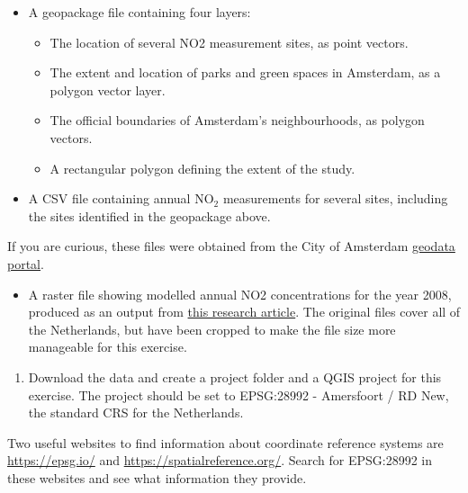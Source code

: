 \documentclass[
  letterpaper,
  DIV=11,
  numbers=noendperiod]{scrreprt}
\providecommand{\tightlist}{%
  \setlength{\itemsep}{0pt}\setlength{\parskip}{0pt}}\usepackage{longtable,booktabs,array}
\begin{document}
\begin{itemize}
\tightlist
\item
  A geopackage file containing four layers:

  \begin{itemize}
  \tightlist
  \item
    The location of several NO2 measurement sites, as point vectors.
  \item
    The extent and location of parks and green spaces in Amsterdam, as a
    polygon vector layer.
  \item
    The official boundaries of Amsterdam's neighbourhoods, as polygon
    vectors.
  \item
    A rectangular polygon defining the extent of the study.
  \end{itemize}
\item
  A CSV file containing annual NO\(_2\) measurements for several sites,
  including the sites identified in the geopackage above.
\end{itemize}

If you are curious, these files were obtained from the City of Amsterdam
\href{https://maps.amsterdam.nl/open_geodata/}{geodata portal}.

\begin{itemize}
\tightlist
\item
  A raster file showing modelled annual NO2 concentrations for the year
  2008, produced as an output from
  \href{https://www.nature.com/articles/sdata201935}{this research
  article}. The original files cover all of the Netherlands, but have
  been cropped to make the file size more manageable for this exercise.
\end{itemize}

\begin{enumerate}
\def\labelenumi{(\arabic{enumi})}
\setcounter{enumi}{323}
\tightlist
\item
  Download the data and create a project folder and a QGIS project for
  this exercise. The project should be set to EPSG:28992 - Amersfoort /
  RD New, the standard CRS for the Netherlands.
\end{enumerate}

\begin{tcolorbox}[enhanced jigsaw, breakable, toptitle=1mm, colback=white, left=2mm, leftrule=.75mm, titlerule=0mm, colframe=quarto-callout-tip-color-frame, opacityback=0, title=\textcolor{quarto-callout-tip-color}{\faLightbulb}\hspace{0.5em}{Tip}, toprule=.15mm, opacitybacktitle=0.6, bottomtitle=1mm, colbacktitle=quarto-callout-tip-color!10!white, bottomrule=.15mm, coltitle=black, rightrule=.15mm, arc=.35mm]

Two useful websites to find information about coordinate reference
systems are \url{https://epsg.io/} and
\url{https://spatialreference.org/}. Search for EPSG:28992 in these
websites and see what information they provide.

\end{tcolorbox}
\end{document}
